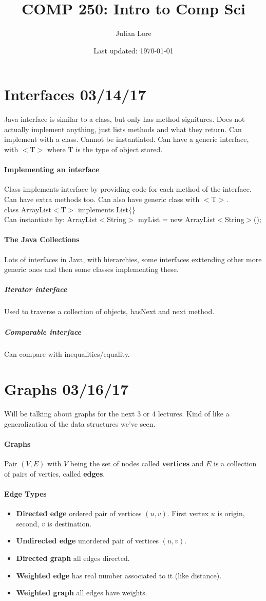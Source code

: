 \documentclass[12 pt]{article}
\author{Julian Lore}
\date{Last updated: \today}
\title{COMP 250: Intro to Comp Sci}
\theoremstyle{definition}
\begin{document}
	\onehalfspacing
	\maketitle
	\tableofcontents
	\section{Interfaces 03/14/17}
	Java interface is similar to a class, but only has method signitures. Does not actually implement anything, just lists methods and what they return. Can implement with a class. Cannot be instantiated. Can have a generic interface, with $<$T$>$ where T is the type of object stored.
	\paragraph{Implementing an interface}
	Class implements interface by providing code for each method of the interface. Can have extra methods too. Can also have generic class with $<$T$>$.
	\\class ArrayList$<$T$>$ implements List\{\}
	\\ Can instantiate by: ArrayList$<$String$>$ myList = new ArrayList$<$String$>$();
	\paragraph{The Java Collections} Lots of interfaces in Java, with hierarchies, some interfaces exttending other more generic ones and then some classes implementing these.
	\subparagraph{Iterator interface} Used to traverse a collection of objects, hasNext and next method.
	\subparagraph{Comparable interface} Can compare with inequalities/equality.
        \section{Graphs 03/16/17} Will be talking about graphs for the next 3 or 4 lectures. Kind of like a generalization of the data structures we've seen.
        \paragraph{Graphs} Pair $(V,E)$ with $V$ being the set of nodes called \textbf{vertices} and $E$ is a collection of pairs of verties, called \textbf{edges}.
        \paragraph{Edge Types}
        \begin{itemize}
        \item \textbf{Directed edge} ordered pair of vertices $(u,v)$. First vertex $u$ is origin, second, $v$ is destination.
        \item \textbf{Undirected edge} unordered pair of vertices $(u,v)$.
        \item \textbf{Directed graph} all edges directed.
        \item \textbf{Weighted edge} has real number associated to it (like distance).
          \item \textbf{Weighted graph} all edges have weights.
        \end{itemize}
\end{document}
